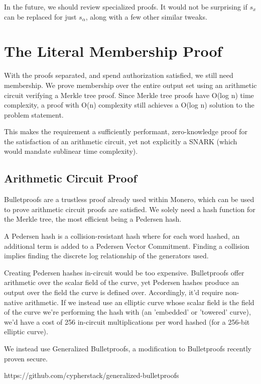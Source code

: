 \documentclass[]{article}
\begin{document}
In the future, we should review specialized proofs. It would not be surprising if $s_x$ can be replaced for just $s_\alpha$, along with a few other similar tweaks.

\newpage

\section{The Literal Membership Proof}

With the proofs separated, and spend authorization satisfied, we still need membership. We prove membership over the entire output set using an arithmetic circuit verifying a Merkle tree proof. Since Merkle tree proofs have O(log n) time complexity, a proof with O(n) complexity still achieves a O(log n) solution to the problem statement.

This makes the requirement a sufficiently performant, zero-knowledge proof for the satisfaction of an arithmetic circuit, yet not explicitly a SNARK (which would mandate sublinear time complexity).

\subsection{Arithmetic Circuit Proof}

Bulletproofs are a trustless proof already used within Monero, which can be used to prove arithmetic circuit proofs are satisfied. We solely need a hash function for the Merkle tree, the most efficient being a Pedersen hash.

A Pedersen hash is a collision-resistant hash where for each word hashed, an additional term is added to a Pedersen Vector Commitment. Finding a collision implies finding the discrete log relationship of the generators used.

Creating Pedersen hashes in-circuit would be too expensive. Bulletproofs offer arithmetic over the scalar field of the curve, yet Pedersen hashes produce an output over the field the curve is defined over. Accordingly, it'd require non-native arithmetic. If we instead use an elliptic curve whose scalar field is the field of the curve we're performing the hash with (an 'embedded' or 'towered' curve), we'd have a cost of 256 in-circuit multiplications per word hashed (for a 256-bit elliptic curve).

We instead use Generalized Bulletproofs, a modification to Bulletproofs recently proven secure.

https://github.com/cypherstack/generalized-bulletproofs
\end{document}
